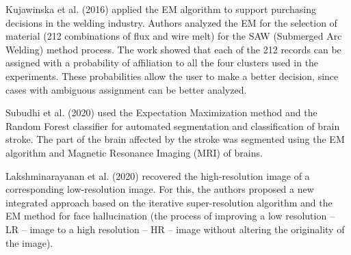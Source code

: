 
Kujawinska et al. (2016) \cite{kujawinska2016} applied the EM algorithm to support purchasing decisions in the welding industry. Authors analyzed the EM for the selection of material (212 combinations of flux and wire melt) for the SAW (Submerged Arc Welding) method process. The work showed that each of the
212 records can be assigned with a probability of affiliation to all the four clusters used in the experiments. These probabilities allow the user to make a better decision, since cases with ambiguous assignment can be better analyzed.

Subudhi et al. (2020) \cite{subudhi2020automated} used the Expectation Maximization method and the Random Forest classifier for automated segmentation and classification of brain stroke. The part of the brain affected by the stroke was segmented using the EM algorithm and Magnetic Resonance Imaging (MRI) of brains. %


Lakshminarayanan et al. (2020) \cite{lakshminarayanan2020new} recovered the high-resolution image of a corresponding low-resolution image. For this, the authors proposed a new integrated approach based on the iterative super-resolution algorithm and the EM method for face hallucination (the process of improving a low resolution -- LR -- image to a high resolution -- HR -- image without altering the originality of the image). %


